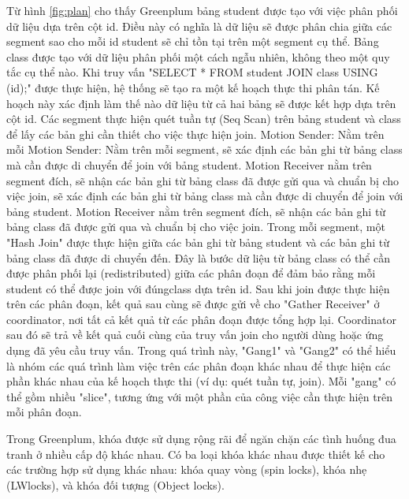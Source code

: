 \documentclass{article}[14pt]
\begin{document}
{Từ hình \ref{fig:plan} cho thấy Greenplum bảng student được tạo với việc phân phối dữ liệu dựa trên cột id. Điều này có nghĩa là dữ liệu sẽ được phân chia giữa các segment sao cho mỗi id student sẽ chỉ tồn tại trên một segment cụ thể. Bảng class được tạo với dữ liệu phân phối một cách ngẫu nhiên, không theo một quy tắc cụ thể nào. Khi truy vấn "SELECT * FROM student JOIN class USING (id);" được thực hiện, hệ thống sẽ tạo ra một kế hoạch thực thi phân tán. Kế hoạch này xác định làm thế nào dữ liệu từ cả hai bảng sẽ được kết hợp dựa trên cột id. Các segment thực hiện quét tuần tự (Seq Scan) trên bảng student và class để lấy các bản ghi cần thiết cho việc thực hiện join. Motion Sender: Nằm trên mỗi Motion Sender: Nằm trên mỗi segment, sẽ xác định các bản ghi từ bảng
class mà cần được di chuyển để join với bảng student.
Motion Receiver nằm trên segment đích, sẽ nhận các bản ghi từ bảng class
đã được gửi qua và chuẩn bị cho việc join, sẽ xác định các bản ghi từ bảng class mà cần được di chuyển để join với bảng student. Motion Receiver nằm trên segment đích, sẽ nhận các bản ghi từ bảng class đã được gửi qua và chuẩn bị cho việc join. Trong mỗi segment, một "Hash Join" được thực hiện giữa các bản ghi từ bảng student và các bản ghi từ bảng class đã được di chuyển đến. Đây là bước dữ liệu từ bảng class có thể cần được phân phối lại (redistributed) giữa các phân đoạn để đảm bảo rằng mỗi student có thể được join với đúngclass dựa trên id. Sau khi join được thực hiện trên các phân đoạn, kết quả sau cùng sẽ được gửi về cho "Gather Receiver" ở coordinator, nơi tất cả kết quả từ các phân đoạn được tổng hợp lại. Coordinator sau đó sẽ trả về kết quả cuối cùng của truy vấn join cho người dùng hoặc ứng dụng đã yêu cầu truy vấn. Trong quá trình này, "Gang1" và "Gang2" có thể hiểu là nhóm các quá trình làm việc trên các phân đoạn khác nhau để thực hiện các phần khác nhau của kế hoạch thực thi (ví dụ: quét tuần tự, join). Mỗi "gang" có thể gồm nhiều "slice", tương ứng với một phần của công việc cần thực hiện trên mỗi phân
đoạn.

Trong Greenplum, khóa được sử dụng rộng rãi để ngăn chặn các tình huống
đua tranh ở nhiều cấp độ khác nhau. Có ba loại khóa khác nhau được thiết kế cho các trường hợp sử dụng khác nhau: khóa quay vòng (spin locks), khóa nhẹ (LWlocks), và khóa đối tượng (Object locks).

}
\end{document}
